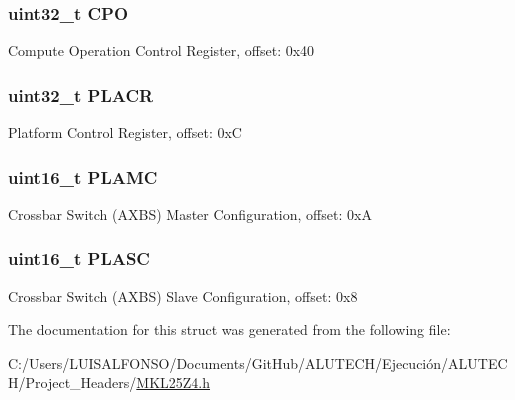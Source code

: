 \subsubsection[{C\+P\+O}]{\setlength{\rightskip}{0pt plus 5cm}uint32\+\_\+t C\+P\+O}\label{struct_m_c_m___mem_map_a35ef884d3cd29240febb8d3fc3df26d0}
Compute Operation Control Register, offset\+: 0x40 \hypertarget{struct_m_c_m___mem_map_aa33a270057a47b918858749d81ff626c}{}
\subsubsection[{P\+L\+A\+C\+R}]{\setlength{\rightskip}{0pt plus 5cm}uint32\+\_\+t P\+L\+A\+C\+R}\label{struct_m_c_m___mem_map_aa33a270057a47b918858749d81ff626c}
Platform Control Register, offset\+: 0x\+C \hypertarget{struct_m_c_m___mem_map_a93b5b2392197fc5d6806ef7d6c131068}{}
\subsubsection[{P\+L\+A\+M\+C}]{\setlength{\rightskip}{0pt plus 5cm}uint16\+\_\+t P\+L\+A\+M\+C}\label{struct_m_c_m___mem_map_a93b5b2392197fc5d6806ef7d6c131068}
Crossbar Switch (A\+X\+B\+S) Master Configuration, offset\+: 0x\+A \hypertarget{struct_m_c_m___mem_map_a20825db9d55d933be269bd35a200fd2d}{}
\subsubsection[{P\+L\+A\+S\+C}]{\setlength{\rightskip}{0pt plus 5cm}uint16\+\_\+t P\+L\+A\+S\+C}\label{struct_m_c_m___mem_map_a20825db9d55d933be269bd35a200fd2d}
Crossbar Switch (A\+X\+B\+S) Slave Configuration, offset\+: 0x8 

The documentation for this struct was generated from the following file\+:\begin{DoxyCompactItemize}
\item 
C\+:/\+Users/\+L\+U\+I\+S\+A\+L\+F\+O\+N\+S\+O/\+Documents/\+Git\+Hub/\+A\+L\+U\+T\+E\+C\+H/\+Ejecución/\+A\+L\+U\+T\+E\+C\+H/\+Project\+\_\+\+Headers/\hyperlink{_m_k_l25_z4_8h}{M\+K\+L25\+Z4.\+h}\end{DoxyCompactItemize}

